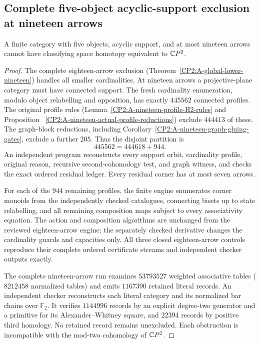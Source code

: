 \subsection{Complete five-object acyclic-support exclusion at nineteen arrows}

\begin{theorem}
\label{CP2:A-five-object-acyclic-nineteen-complete}
A finite category with five objects, acyclic support, and at most nineteen
arrows cannot have classifying space homotopy equivalent to $\mathbb{C}P^2$.
\end{theorem}
\begin{proof}
The complete eighteen-arrow exclusion
(Theorem~\ref{CP2:A-global-lower-nineteen}) handles all smaller cardinalities.
At nineteen arrows a projective-plane category must have connected support.
The fresh cardinality enumeration, modulo object relabelling and opposition,
has exactly $445562$ connected profiles. The original profile rules
(Lemma~\ref{CP2:A-nineteen-profile-H2-rules} and Proposition~
\ref{CP2:A-nineteen-actual-profile-reductions}) exclude $444413$ of these.
The graph-block reductions, including
Corollary~\ref{CP2:A-nineteen-graph-gluing-gates}, exclude a further $205$.
Thus the disjoint partition is
\[
445562=444618+944.
\]
An independent program reconstructs every support orbit, cardinality
profile, original reason, recursive second-cohomology test, and graph
witness, and checks the exact ordered residual ledger. Every residual
corner has at most seven arrows.

For each of the $944$ remaining profiles, the finite engine enumerates
corner monoids from the independently checked catalogues, connecting
bisets up to state relabelling, and all remaining composition maps subject
to every associativity equation. The action and composition algorithms
are unchanged from the reviewed eighteen-arrow engine; the separately
checked derivative changes the cardinality guards and capacities only.
All three closed eighteen-arrow controls reproduce their complete
ordered certificate streams and independent checker outputs exactly.

The complete nineteen-arrow run examines $53793527$ weighted associative
tables ($8212458$ normalized tables) and emits $1167390$ retained literal
records. An independent checker reconstructs each literal category and
its normalized bar chains over $\mathbb F_2$. It verifies $1144996$
records by an explicit degree-two generator and a primitive for its
Alexander--Whitney square, and $22394$ records by positive third
homology. No retained record remains unexcluded. Each obstruction is
incompatible with the mod-two cohomology of $\mathbb{C}P^2$.


\end{proof}
